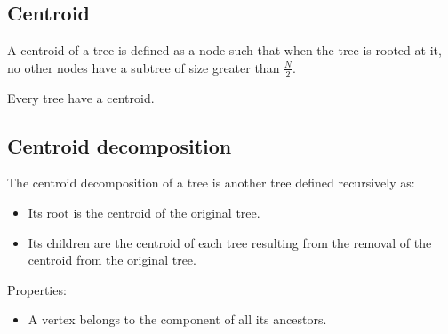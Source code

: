 \subsection{Centroid}

A  centroid of a tree is defined as a node such that when the tree is rooted at it, no other nodes have a subtree of size greater than $\frac{N}{2}$.

Every tree have a centroid.

\subsection{Centroid decomposition}

The centroid decomposition of a tree is another tree defined recursively as:

\begin{itemize}
  \item Its root is the centroid of the original tree.
  \item Its children are the centroid of each tree resulting from the removal of the centroid from the original tree.
\end{itemize}

Properties:

\begin{itemize}
  \item A vertex belongs to the component of all its ancestors.
\end{itemize}


